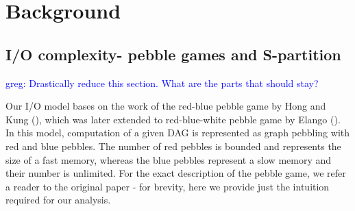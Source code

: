 \documentclass[sigconf]{acmart}
\newcommand\greg[1]{\textcolor{blue}{greg: #1}}
\begin{document}
%	
%	
%	
%	
%	
%	
	\section{Background}
	\subsection{I/O complexity- pebble games and S-partition}
	\label{sec:background}
	\greg{Drastically reduce this section. What are the parts that should stay?}
	
	Our I/O model bases on the work of the red-blue pebble game by Hong and 
	Kung 
	(\cite{redblue}), which was later extended to red-blue-white pebble game by 
	Elango (\cite{redbluewhite}). In this model, computation of a given DAG is 
	represented as graph 
	pebbling with red and blue pebbles. The number of red pebbles is 
	bounded and represents the size of a fast memory, whereas the blue pebbles 
	represent a slow memory and their number is unlimited. For the exact 
	description of the pebble game, we refer a reader to the original paper - 
	for brevity, here we provide just the intuition required for our analysis.
	 
\end{document}
